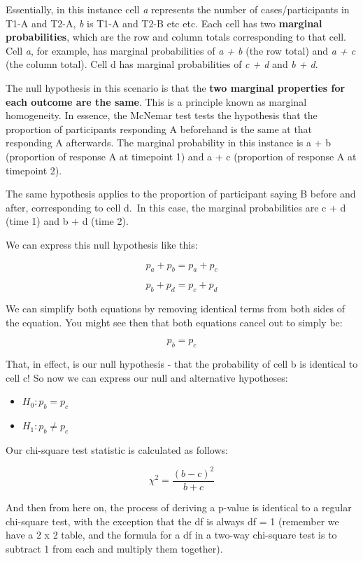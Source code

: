 \documentclass[
]{book}
\providecommand{\tightlist}{%
  \setlength{\itemsep}{0pt}\setlength{\parskip}{0pt}}
\begin{document}
Essentially, in this instance cell \emph{a} represents the number of cases/participants in T1-A and T2-A, \emph{b} is T1-A and T2-B etc etc. Each cell has two \textbf{marginal probabilities}, which are the row and column totals corresponding to that cell. Cell \emph{a}, for example, has marginal probabilities of \emph{a + b} (the row total) and \emph{a + c} (the column total). Cell d has marginal probabilities of \emph{c + d} and \emph{b + d}.

The null hypothesis in this scenario is that the \textbf{two marginal properties for each outcome are the same}. This is a principle known as marginal homogeneity. In essence, the McNemar test tests the hypothesis that the proportion of participants responding A beforehand is the same at that responding A afterwards. The marginal probability in this instance is a + b (proportion of response A at timepoint 1) and a + c (proportion of response A at timepoint 2).

The same hypothesis applies to the proportion of participant saying B before and after, corresponding to cell d.~In this case, the marginal probabilities are c + d (time 1) and b + d (time 2).

We can express this null hypothesis like this:

\[
p_a + p_b = p_a + p_c
\]

\[
p_b + p_d = p_c + p_d
\]

We can simplify both equations by removing identical terms from both sides of the equation. You might see then that both equations cancel out to simply be:

\[
p_b = p_c
\]

That, in effect, is our null hypothesis - that the probability of cell b is identical to cell c! So now we can express our null and alternative hypotheses:

\begin{itemize}
\tightlist
\item
  \(H_0: p_b = p_c\)
\item
  \(H_1: p_b \neq p_c\)
\end{itemize}

Our chi-square test statistic is calculated as follows:

\[
\chi^2 = \frac{(b-c)^2}{b+c}
\]

And then from here on, the process of deriving a p-value is identical to a regular chi-square test, with the exception that the df is always df = 1 (remember we have a 2 x 2 table, and the formula for a df in a two-way chi-square test is to subtract 1 from each and multiply them together).
\end{document}
